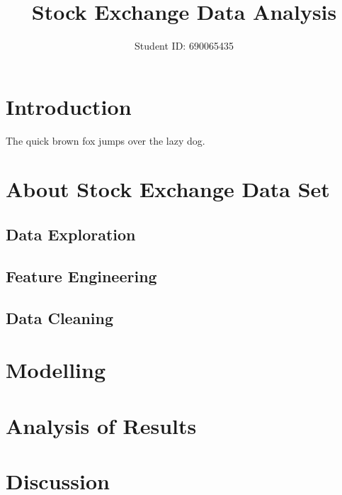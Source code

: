 \documentclass[a4paper, 11pt]{article}
\begin{document}
\title{Stock Exchange Data Analysis}
\author{Student ID: 690065435}
\maketitle

\section{Introduction}
The quick brown fox jumps over the lazy dog.

\section{About Stock Exchange Data Set}

\subsection{Data Exploration}

\subsection{Feature Engineering}

\subsection{Data Cleaning}

\section{Modelling}

\section{Analysis of Results}

\section{Discussion}
\end{document}
